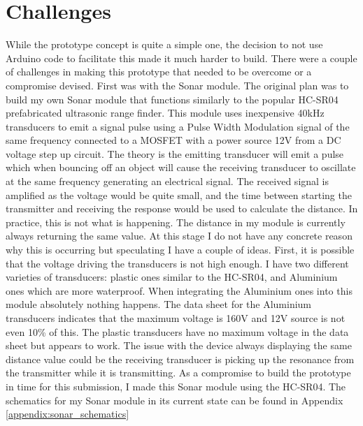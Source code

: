 \documentclass[11pt,a4paper,titlepage]{report}
\begin{document}
	\section*{Challenges}
	While the prototype concept is quite a simple one, the decision to not use Arduino code to facilitate this made it much harder to build. There were a couple of challenges in making this prototype that needed to be overcome or a compromise devised. First was with the Sonar module. The original plan was to build my own Sonar module that functions similarly to the popular HC-SR04\cite{HC-SR04} prefabricated ultrasonic range finder. This module uses inexpensive 40\unit{\kilo\hertz} transducers to emit a signal pulse using a Pulse Width Modulation signal of the same frequency connected to a MOSFET with a power source 12\unit{\volt} from a DC voltage step up circuit. The theory is the emitting transducer will emit a pulse which when bouncing off an object will cause the receiving transducer to oscillate at the same frequency generating an electrical signal. The received signal is amplified as the voltage would be quite small, and the time between starting the transmitter and receiving the response would be used to calculate the distance. In practice, this is not what is happening. The distance in my module is currently always returning the same value. At this stage I do not have any concrete reason why this is occurring but speculating I have a couple of ideas. First, it is possible that the voltage driving the transducers is not high enough. I have two different varieties of transducers: plastic ones\cite{PLASTIC_TRANSDUCER} similar to the HC-SR04, and Aluminium ones\cite{ALUMINIUM_TRANSDUCER} which are more waterproof. When integrating the Aluminium ones into this module absolutely nothing happens. The data sheet for the Aluminium transducers indicates that the maximum voltage is 160\unit{\volt} and 12\unit{\volt} source is not even 10\unit{\percent} of this. The plastic transducers have no maximum voltage in the data sheet but appears to work. The issue with the device always displaying the same distance value could be the receiving transducer is picking up the resonance from the transmitter while it is transmitting. As a compromise to build the prototype in time for this submission, I made this Sonar module using the HC-SR04\cite{HC-SR04}. The schematics for my Sonar module in its current state can be found in Appendix \ref{appendix:sonar_schematics}
	
\end{document}
